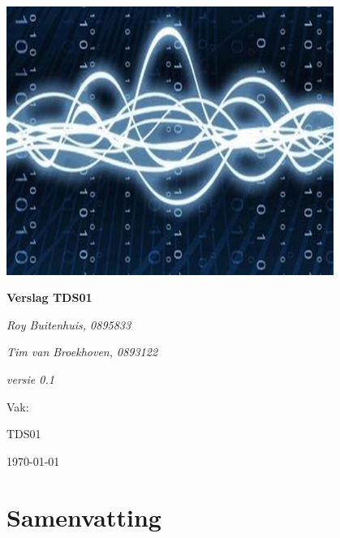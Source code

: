 \documentclass[11pt,a4paper]{article}
\def\auteureen{Roy Buitenhuis, 0895833}
\def\auteurtwee{Tim van Broekhoven, 0893122}
\def\titel{Verslag TDS01}
\def\datum{\today}
\def\versie{0.1}
\begin{document}
	
	\begin{titlepage}
		
		\centering
		\includegraphics[width=0.80\textwidth]{image1}\par\vspace{1cm}
		{\huge\bfseries \titel \par}
		
		\vspace{1cm}
		{\Large\itshape \auteureen \par}
		{\Large\itshape \auteurtwee \par}
		\vspace{1cm}
		{\Large\itshape versie \versie\par}
				
		\vfill
		Vak:\par
		TDS01
		
		\vfill
		{\large \datum \par}
	\end{titlepage}

	\section{Samenvatting}
	
	\clearpage
	
	\tableofcontents
	
	\clearpage
	
	\listoffigures
	
	\clearpage
	\listoftables
	
	\clearpage
	
\end{document}
